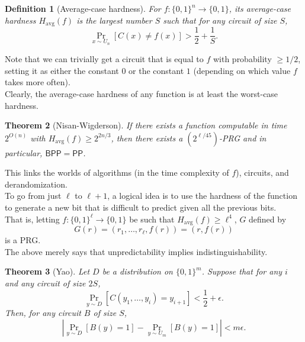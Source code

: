 \documentclass{article}
\newcounter{lecnum}
\newtheorem{theorem}{Theorem}[lecnum]
\newtheorem{definition}[theorem]{Definition}
\newcommand{\BPP}{\mathsf{BPP}}
\newcommand{\PP}{\mathsf{PP}}
\newcommand{\avg}{\text{avg}}
\begin{document}
	\begin{definition}[Average-case hardness]
		For $f : \{0,1\}^n \to \{0,1\}$, its \emph{average-case hardness} $H_\text{avg}(f)$ is the largest number $S$ such that for any circuit of size $S$,
		\[ \Pr_{x \sim U_n} \left[ C(x) \ne f(x) \right] > \frac{1}{2} + \frac{1}{S}. \]
	\end{definition}
	Note that we can trivially get a circuit that is equal to $f$ with probability $\ge 1/2$, setting it as either the constant $0$ or the constant $1$ (depending on which value $f$ takes more often).\\
	Clearly, the average-case hardness of any function is at least the worst-case hardness.

	\begin{theorem}[Nisan-Wigderson]
		\label{theo: hard to prg}
		If there exists a function computable in time $2^{O(n)}$ with $H_\avg(f) \ge 2^{2n/3}$, then there exists a $(2^{\ell/45})$-PRG and in particular, $\BPP = \PP$.
	\end{theorem}
	This links the worlds of algorithms (in the time complexity of $f$), circuits, and derandomization.\\

	To go from just $\ell$ to $\ell+1$, a logical idea is to use the hardness of the function to generate a new bit that is difficult to predict given all the previous bits.\\
	That is, letting $f : \{0,1\}^\ell \to \{0,1\}$ be such that $H_\avg(f) \ge \ell^4$, $G$ defined by
	\[ G(r) = (r_1,\ldots,r_\ell,f(r)) = (r,f(r)) \]
	is a PRG.\\
	The above merely says that unpredictability implies indistinguishability.
	

	\begin{theorem}[Yao]
		\label{yao}
		Let $D$ be a distribution on $\{0,1\}^m$. Suppose that for any $i$ and any circuit of size $2S$,
		\[ \Pr_{y \sim D} [C(y_1,\ldots,y_i) = y_{i+1}] < \frac{1}{2} + \epsilon. \]
		Then, for any circuit $B$ of size $S$,
		\[ \left| \Pr_{y \sim D} [B(y) = 1] - \Pr_{y \sim U_m}[B(y) = 1] \right| < m\epsilon. \]
	\end{theorem}
\end{document}
